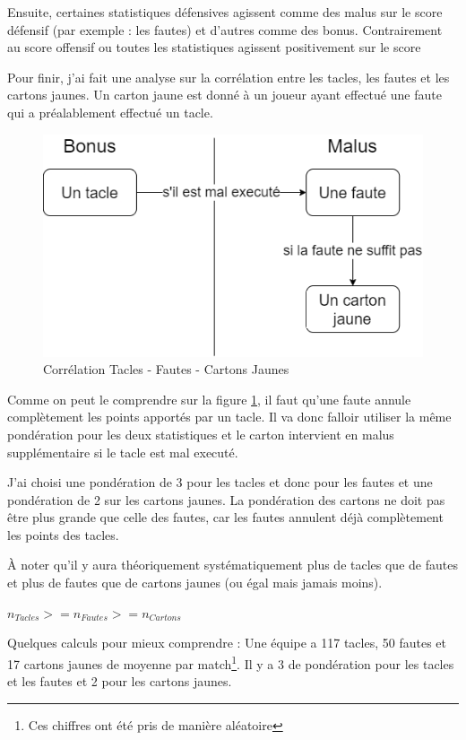 \documentclass[a4paper,14pt]{extarticle}
\begin{document}
{Ensuite, certaines statistiques défensives agissent comme des malus sur le score défensif (par exemple : les fautes) et d'autres comme des bonus. Contrairement au score offensif ou toutes les statistiques agissent positivement sur le score

Pour finir, j'ai fait une analyse sur la corrélation entre les tacles, les fautes et les cartons jaunes. Un carton jaune est donné à un joueur ayant effectué une faute qui a préalablement effectué un tacle.

\begin{figure}[H]
    \centering
    \includegraphics[width=15cm]{../img/schemaTacleFaute.png}
    \caption{Corrélation Tacles - Fautes - Cartons Jaunes}
    \label{fig:correlationTacleFaute}
\end{figure}

Comme on peut le comprendre sur la figure \ref{fig:correlationTacleFaute}, il faut qu'une faute annule complètement les points apportés par un tacle. Il va donc falloir utiliser la même pondération pour les deux statistiques et le carton intervient en malus supplémentaire si le tacle est mal executé.

J'ai choisi une pondération de 3 pour les tacles et donc pour les fautes et une pondération de 2 sur les cartons jaunes. La pondération des cartons ne doit pas être plus grande que celle des fautes, car les fautes annulent déjà complètement les points des tacles. 

À noter qu'il y aura théoriquement systématiquement plus de tacles que de fautes et plus de fautes que de cartons jaunes (ou égal mais jamais moins).

$n_{Tacles} >= n_{Fautes} >= n_{Cartons}  $

Quelques calculs pour mieux comprendre :
Une équipe a 117 tacles, 50 fautes et 17 cartons jaunes de moyenne par match\footnote{Ces chiffres ont été pris de manière aléatoire}. Il y a 3 de pondération pour les tacles et les fautes et 2 pour les cartons jaunes.

}
\end{document}
